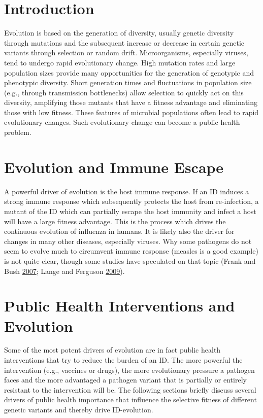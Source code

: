 \documentclass[]{book}
\theoremstyle{definition}
\theoremstyle{definition}
\theoremstyle{definition}
\theoremstyle{remark}
\begin{document}
\section{Introduction}\label{introduction-13}

Evolution is based on the generation of diversity, usually genetic
diversity through mutations and the subsequent increase or decrease in
certain genetic variants through selection or random drift.
Microorganisms, especially viruses, tend to undergo rapid evolutionary
change. High mutation rates and large population sizes provide many
opportunities for the generation of genotypic and phenotypic diversity.
Short generation times and fluctuations in population size (e.g.,
through transmission bottlenecks) allow selection to quickly act on this
diversity, amplifying those mutants that have a fitness advantage and
eliminating those with low fitness. These features of microbial
populations often lead to rapid evolutionary changes. Such evolutionary
change can become a public health problem.

\section{Evolution and Immune Escape}\label{evolution-and-immune-escape}

A powerful driver of evolution is the host immune response. If an ID
induces a strong immune response which subsequently protects the host
from re-infection, a mutant of the ID which can partially escape the
host immunity and infect a host will have a large fitness advantage.
This is the process which drives the continuous evolution of influenza
in humans. It is likely also the driver for changes in many other
diseases, especially viruses. Why some pathogens do not seem to evolve
much to circumvent immune response (measles is a good example) is not
quite clear, though some studies have speculated on that topic (Frank
and Bush \protect\hyperlink{ref-frank07}{2007}; Lange and Ferguson
\protect\hyperlink{ref-lange09}{2009}).

\section{Public Health Interventions and
Evolution}\label{public-health-interventions-and-evolution}

Some of the most potent drivers of evolution are in fact public health
interventions that try to reduce the burden of an ID. The more powerful
the intervention (e.g., vaccines or drugs), the more evolutionary
pressure a pathogen faces and the more advantaged a pathogen variant
that is partially or entirely resistant to the intervention will be. The
following sections briefly discuss several drivers of public health
importance that influence the selective fitness of different genetic
variants and thereby drive ID-evolution.
\end{document}

